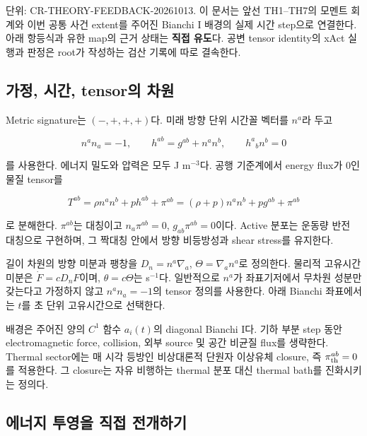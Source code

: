단위: CR-THEORY-FEEDBACK-20261013. 이 문서는 앞선 TH1--TH7의 모멘트 회계와 이번 공통 사건 extent를 주어진 Bianchi I 배경의 실제 시간 step으로 연결한다. 아래 항등식과 유한 map의 근거 상태는 \textbf{직접 유도}다. 공변 tensor identity의 xAct 실행과 판정은 root가 작성하는 검산 기록에 따로 결속한다.

\hypertarget{uxac00uxc815-uxc2dcuxac04-tensoruxc758-uxcc28uxc6d0}{%
\subsection{가정, 시간, tensor의 차원}\label{uxac00uxc815-uxc2dcuxac04-tensoruxc758-uxcc28uxc6d0}}

Metric signature는 \((-,+,+,+)\)다. 미래 방향 단위 시간꼴 벡터를 \(n^a\)라 두고

\[
n^an_a=-1,\qquad
h^{ab}=g^{ab}+n^an^b,\qquad h^a{}_bn^b=0
\]

를 사용한다. 에너지 밀도와 압력은 모두 J m\(^{-3}\)다. 공행 기준계에서 energy flux가 0인 물질 tensor를

\[
T^{ab}=\rho n^an^b+p h^{ab}+\pi^{ab}
=(\rho+p)n^an^b+p g^{ab}+\pi^{ab}
\]

로 분해한다. \(\pi^{ab}\)는 대칭이고 \(n_a\pi^{ab}=0\), \(g_{ab}\pi^{ab}=0\)이다. Active 분포는 운동량 반전 대칭으로 구현하며, 그 짝대칭 안에서 방향 비등방성과 shear stress를 유지한다.

길이 차원의 방향 미분과 팽창을 \(D_n=n^a\nabla_a\), \(\Theta=\nabla_an^a\)로 정의한다. 물리적 고유시간 미분은 \(\dot F=cD_nF\)이며, \(\theta=c\Theta\)는 s\(^{-1}\)다. 일반적으로 \(n^a\)가 좌표기저에서 무차원 성분만 갖는다고 가정하지 않고 \(n^an_a=-1\)의 tensor 정의를 사용한다. 아래 Bianchi 좌표에서는 \(t\)를 초 단위 고유시간으로 선택한다.

배경은 주어진 양의 \(C^1\) 함수 \(a_i(t)\)의 diagonal Bianchi I다. 기하 부분 step 동안 electromagnetic force, collision, 외부 source 및 공간 비균질 flux를 생략한다. Thermal sector에는 매 시각 등방인 비상대론적 단원자 이상유체 closure, 즉 \(\pi_{\rm th}^{ab}=0\)를 적용한다. 그 closure는 자유 비행하는 thermal 분포 대신 thermal bath를 진화시키는 정의다.

\hypertarget{uxc5d0uxb108uxc9c0-uxd22cuxc601uxc744-uxc9c1uxc811-uxc804uxac1cuxd558uxae30}{%
\subsection{에너지 투영을 직접 전개하기}\label{uxc5d0uxb108uxc9c0-uxd22cuxc601uxc744-uxc9c1uxc811-uxc804uxac1cuxd558uxae30}}

